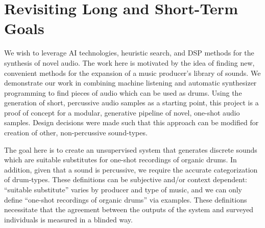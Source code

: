 \documentclass[\main/thesis.tex]{subfiles}
\begin{document}


\section{Revisiting Long and Short-Term Goals}
We wish to leverage AI technologies, heuristic search, and DSP methods for the synthesis of novel audio. The work here is motivated by the idea of finding new, convenient methods for the expansion of a music producer's library of sounds. We demonstrate our work in combining machine listening and automatic synthesizer programming to find pieces of audio which can be used as drums. Using the generation of short, percussive audio samples as a starting point, this project is a proof of concept for a modular, generative pipeline of novel, one-shot audio samples. Design decisions were made such that this approach can be modified for creation of other, non-percussive sound-types. 

The goal here is to create an unsupervised system that generates discrete sounds which are suitable substitutes for one-shot recordings of organic drums. In addition, given that a sound is percussive, we require the accurate categorization of drum-types. These definitions can be subjective and/or context dependent: \enquote{suitable substitute} varies by producer and type of music, and we can only define \enquote{one-shot recordings of organic drums} via examples. These definitions necessitate that the agreement between the outputs of the system and surveyed individuals is measured in a blinded way. 

\end{document}
